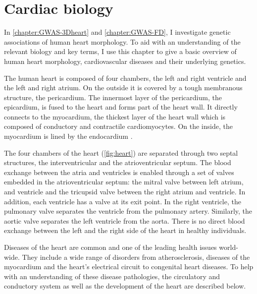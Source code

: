\chapter{Cardiac biology}
\label{chapter:intro-heart}
In \cref{chapter:GWAS-3Dheart} and \cref{chapter:GWAS-FD}, I investigate genetic associations of human heart morphology. To aid with an understanding of the relevant biology and key terms, I use this chapter to give a basic overview of human heart morphology, cardiovascular diseases and their underlying genetics.

The human heart is composed of four chambers, the left and right ventricle and the left and right atrium. On the outside it is covered by a tough membranous structure, the pericardium. The innermost layer of the  pericardium, the epicardium, is fused to the heart and forms part of the heart wall. It directly connects to the myocardium, the thickest layer of the heart wall which is composed of conductory and contractile cardiomyocytes. On the inside, the myocardium is lined by the endocardium \citep{Betts2013}.  

The four chambers of the heart (\cref{fig:heart}) are separated through two septal structures, the interventricular and the atrioventricular septum. The blood exchange between the atria and ventricles is enabled through a set of valves embedded in the atrioventricular septum: the mitral valve between left atrium, and ventricle and the tricupsid valve between the right atrium and ventricle. In addition, each ventricle has a valve at its exit point. In the right ventricle, the pulmonary valve separates the ventricle from the pulmonary artery. Similarly, the aortic valve separates the left ventricle from the aorta. There is no direct blood exchange between the left and the right side of the heart in healthy individuals. 

Diseases of the heart are common and one of the leading health issues world-wide. They include a wide range of disorders from atherosclerosis, diseases of the myocardium and the heart’s electrical circuit to congenital heart diseases. To help with an understanding of these disease pathologies, the circulatory and conductory system as well as the development of the heart are described below.

